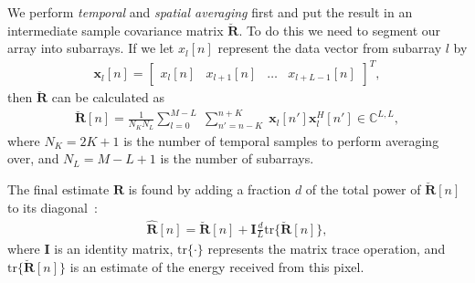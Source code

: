 \documentclass[10pt,journal,draftclsnofoot,onecolumn]{IEEEtran}
\newcommand\bmat[1]{\begin{bmatrix}#1\end{bmatrix}}
\newcommand\tr{\text{tr}}
\newcommand\sumb[2]{\sum\limits_{#1}^{#2}\;}
\newcommand\T{^{\scriptscriptstyle T}}
\renewcommand\H{^{\scriptscriptstyle H}}
\renewcommand\vec[1]{\boldsymbol{#1}}
\newcommand\mat[1]{\boldsymbol{#1}}
\newcommand\1{\vec 1}
\newcommand\I{\mat I}
\newcommand*\x{\vec x}
\newcommand*\R{\mat R}
\newcommand*\eR{\mat{\hat R}}
\begin{document}
We perform \emph{temporal} and \emph{spatial averaging} first and put the result in an intermediate sample covariance matrix $\breve{\R}$. To do this we need to segment our array into subarrays. If we let $x_l[n]$ represent the data vector from subarray $l$ by
\begin{gather}
\x_l[n] = \bmat{x_l[n] & x_{l+1}[n] & \dots & x_{l+L-1}[n]}\T,
\end{gather}
then $\breve{\R}$ can be calculated as
\begin{gather}
\breve{\R}[n] =  \frac{1}{N_K N_L} \sumb{l=0}{M-L}\sumb{n'=n-K}{n+K} \x_l[n']\x_l\H[n'] \in\mathbb{C}^{L,L},\label{spatialR}
\end{gather}
where $N_K = 2K+1$ is the number of temporal samples to perform averaging over, and $N_L = M-L+1$ is the number of subarrays.

The final estimate $\eR$ is found by adding a fraction $d$ of the total power of $\breve{\R}[n]$ to its diagonal~\cite{Synnevag2007}:
\begin{align}
\eR[n] = \breve{\R}[n] + \I \frac{d}{L} \tr\{\breve{\R}[n]\},\label{finalR}
\end{align}
where $\I$ is an identity matrix, $\tr\{\cdot\}$ represents the matrix trace operation, and $\tr\{\breve{\R}[n]\}$ is an estimate of the energy received from this pixel.
\end{document}

